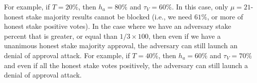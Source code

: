 %
%
%
For example, if $T = 20\%$, then $h_a = 80\%$ and $\tau_V = 60\%$. In this case, only $\mu = 21$-honest stake majority results cannot be blocked (i.e., we need $61\%$, or more of honest stake positive votes). In the case where we have an adversary stake percent that is greater, or equal than $1/3 \times 100$, then even if we have a unanimous honest stake majority approval, the adversary can still launch an denial of approval attack. For example, if $T = 40\%$, then $h_a = 60\%$ and $\tau_V = 70\%$ and even if all the honest stake votes positively, the adversary can still launch a denial of approval attack.

